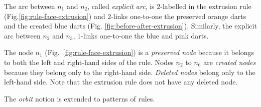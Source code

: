 The arc between $n_1$ and $n_2$, called \emph{explicit arc}, is $2$-labelled in the extrusion rule
(Fig.\ref{fig:rule-face-extrusion}) and $2$-links one-to-one the preserved orange
darts and the created blue darts (Fig. \ref{fig:before-after-extrusion}). %
Similarly, the explicit arc between $n_2$ and $n_3$, $1$-links one-to-one the blue and pink darts. %

The node $n_{1}$ (Fig.~\ref{fig:rule-face-extrusion}) is a \emph{preserved node}
because it belongs to both the left and right-hand sides of the rule. %
Nodes $n_{2}$ to $n_{6}$ are \emph{created nodes} because they belong only to
the right-hand side. %
\emph{Deleted nodes} belong only to the left-hand side. %
Note that the extrusion rule does not have any deleted node. %

The \emph{orbit} notion is extended to patterns of rules. %

